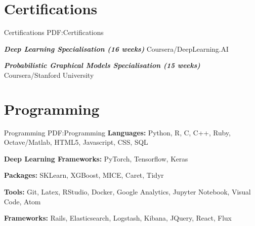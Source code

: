 \documentclass[letterpaper,10pt,oneside]{article}
\begin{document}
\begin{body}
\section
{Certifications}
{Certifications}
{PDF:Certifications}

\textbf{\textit{Deep Learning Specialisation (16 weeks)}} Coursera/DeepLearning.AI 
\hfill
{}

\textbf{\textit{Probabilistic Graphical Models Specialisation (15 weeks)}} Coursera/Stanford University 
\hfill
{}


\section
{Programming}
{Programming}
{PDF:Programming}
\textbf{Languages:} Python, R, C, C++, Ruby, Octave/Matlab, HTML5, Javascript, CSS, SQL

\textbf{Deep Learning Frameworks:}  PyTorch, Tensorflow, Keras

\textbf{Packages:} SKLearn, XGBoost, MICE, Caret, Tidyr

\textbf{Tools:} Git, Latex, RStudio, Docker, Google Analytics, Jupyter Notebook, Visual Code, Atom

\textbf{Frameworks:} Rails, Elasticsearch, Logstash, Kibana, JQuery, React, Flux
\end{body}


\label{LastPage}~
\end{document}

